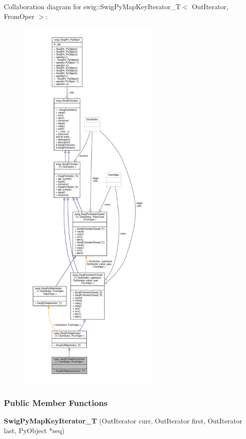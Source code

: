 Collaboration diagram for swig\+:\+:Swig\+Py\+Map\+Key\+Iterator\+\_\+T$<$ Out\+Iterator, From\+Oper $>$\+:
\nopagebreak
\begin{figure}[H]
\begin{center}
\leavevmode
\includegraphics[height=550pt]{d4/d97/structswig_1_1SwigPyMapKeyIterator__T__coll__graph}
\end{center}
\end{figure}
\subsubsection*{Public Member Functions}
\begin{DoxyCompactItemize}
\item 
{\bf Swig\+Py\+Map\+Key\+Iterator\+\_\+T} (Out\+Iterator curr, Out\+Iterator first, Out\+Iterator last, Py\+Object $\ast$seq)
\end{DoxyCompactItemize}
